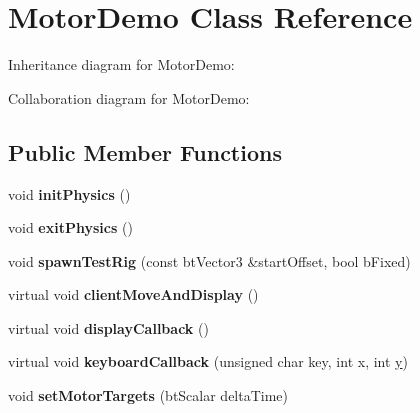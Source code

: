 \hypertarget{class_motor_demo}{\section{Motor\+Demo Class Reference}
\label{class_motor_demo}
}


Inheritance diagram for Motor\+Demo\+:


Collaboration diagram for Motor\+Demo\+:
\subsection*{Public Member Functions}
\begin{DoxyCompactItemize}
\item 
\hypertarget{class_motor_demo_a49e2598a527297c6f76c9d9308479a21}{void {\bfseries init\+Physics} ()}\label{class_motor_demo_a49e2598a527297c6f76c9d9308479a21}

\item 
\hypertarget{class_motor_demo_ac65695293648aef597c7581867fce776}{void {\bfseries exit\+Physics} ()}\label{class_motor_demo_ac65695293648aef597c7581867fce776}

\item 
\hypertarget{class_motor_demo_a89facd20efd4290edfcd8d637cea46c4}{void {\bfseries spawn\+Test\+Rig} (const bt\+Vector3 \&start\+Offset, bool b\+Fixed)}\label{class_motor_demo_a89facd20efd4290edfcd8d637cea46c4}

\item 
\hypertarget{class_motor_demo_a897bc169d75cd5206faecffd12eb6d94}{virtual void {\bfseries client\+Move\+And\+Display} ()}\label{class_motor_demo_a897bc169d75cd5206faecffd12eb6d94}

\item 
\hypertarget{class_motor_demo_ac6f231e168b42bc6ab620f44bd6c5044}{virtual void {\bfseries display\+Callback} ()}\label{class_motor_demo_ac6f231e168b42bc6ab620f44bd6c5044}

\item 
\hypertarget{class_motor_demo_aa3c186b4910ff57bb21ce3d0f8215438}{virtual void {\bfseries keyboard\+Callback} (unsigned char key, int x, int \hyperlink{_ice_utils_8h_aa7ffaed69623192258fb8679569ff9ba}{y})}\label{class_motor_demo_aa3c186b4910ff57bb21ce3d0f8215438}

\item 
\hypertarget{class_motor_demo_a0b471228b591aff936e2d1afa29246f3}{void {\bfseries set\+Motor\+Targets} (bt\+Scalar delta\+Time)}\label{class_motor_demo_a0b471228b591aff936e2d1afa29246f3}

\end{DoxyCompactItemize}
